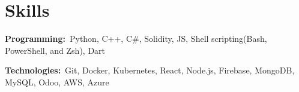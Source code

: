 \documentclass[a4paper]{article}
\newcommand{\resumeSubHeadingListStart}{\begin{itemize}[leftmargin=0.15in, label={}]}
\newcommand{\resumeSubHeadingListEnd}{\end{itemize}}
\begin{document}
\section{Skills}
\vspace{2pt}
\resumeSubHeadingListStart
\small{\item{
		\textbf{Programming:}{~Python, C++, C\#, Solidity, JS, Shell scripting(Bash, PowerShell, and Zsh), Dart} \\ \vspace{3pt}
		
		\textbf{Technologies:}{~Git, Docker, Kubernetes, React, Node.js, Firebase, MongoDB, MySQL, Odoo, AWS, Azure} \\ \vspace{3pt}
		
		
}}
\resumeSubHeadingListEnd
\end{document}

